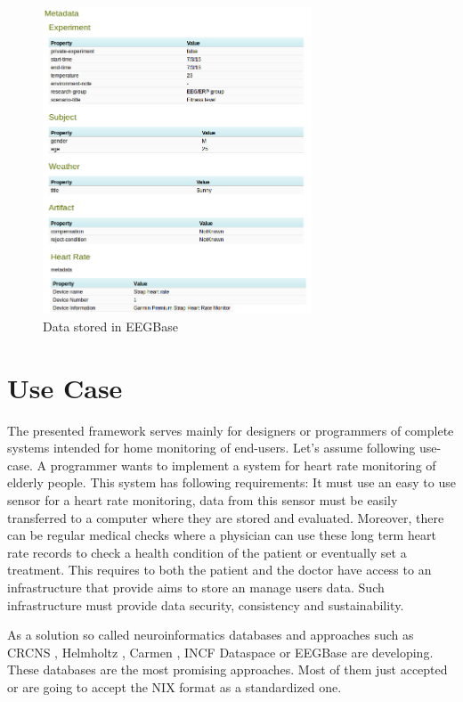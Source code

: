 \documentclass[conference]{IEEEconf}
\begin{document}
\begin{figure}
  \centering\includegraphics[width=8cm]{portal_example.png}
  \caption{Data stored in EEGBase}
  \label{fig:EEGBase}
 \end{figure}


\section{Use Case}\label{sec:use-case}

The presented framework serves mainly for designers or programmers of complete systems intended for home monitoring of end-users. Let's assume following use-case. A programmer wants to implement a system for heart rate monitoring of elderly people. This system has following requirements: It must use an easy to use sensor for a heart rate monitoring, data from this sensor must be easily transferred to a computer where they are stored and evaluated. Moreover, there can be regular medical checks where a physician can use these long term heart rate records to check a health condition of the patient or eventually set a treatment. This requires to both the patient and the doctor have access to an infrastructure that provide aims to store an manage users data. Such infrastructure must provide data security, consistency and sustainability.

As a solution so called neuroinformatics databases and approaches such as CRCNS \cite{CRCNS}, Helmholtz \cite{10.3389/conf.fninf.2013.09.00025}, Carmen \cite{fgibson:Watson2007}, INCF Dataspace \cite{dataspace} or EEGBase \cite{ISI:000306821100004} are developing. These databases are the most promising approaches. Most of them just accepted or are going to accept the NIX format as a standardized one.
\end{document}
